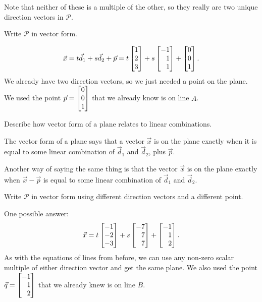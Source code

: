 \documentclass{workbook}
\begin{document}
\begin{slide}
\begin{parts}
\begin{solution}
				Note that neither of these is a multiple of the other, so they
				really are two unique direction vectors in $\mathcal P$.
			\end{solution}
		\item Write $\mathcal P$ in vector form.
			\begin{solution}
				\[
					\vec x = t\vec d_1 +s\vec d_2+\vec p
					= t \mat{1\\2\\3} + s \mat{-1\\1\\1} + \mat{0\\0\\1}.
				\]
				We already have two direction vectors, so we just needed a point
				on the plane. We used the point $\vec p = \mat{0\\0\\1}$
				that we already know is on line $A$.
			\end{solution}
		\item Describe how vector form of a plane relates to linear
			combinations.
			\begin{solution}
				The vector form of a plane says that a vector $\vec x$ is on the
				plane exactly when it is equal to some linear combination of
				$\vec d_1$ and $\vec d_2$, plus $\vec p$.

				Another way of saying
				the same thing is that the vector $\vec x$ is on the plane
				exactly when $\vec x - \vec p$ is equal	to some linear
				combination of $\vec d_1$ and $\vec d_2$.
			\end{solution}
		\item Write $\mathcal P$ in vector form using different
			direction vectors and a different point.
			\begin{solution}
				One possible answer:
				\[
					\vec x = t\mat{-1\\-2\\-3}+s\mat{-7\\7\\7}+\mat{-1\\1\\2}.
				\]
				As with the equations of lines from before, we can use any
				non-zero scalar multiple of either direction vector and get the
				same plane. We also used the point $\vec q = \mat{-1\\1\\2}$
				that we already knew is on line $B$.
			\end{solution}
	\end{parts}
\end{slide}
\end{document}
